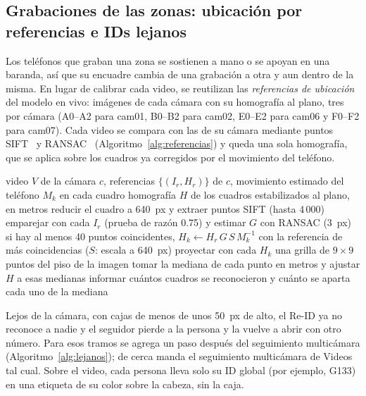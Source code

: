 \documentclass[12pt,a4paper]{article}
\begin{document}
\subsection{Grabaciones de las zonas: ubicación por referencias e IDs lejanos}
\label{sec:grabaciones-zonas}

Los teléfonos que graban una zona se sostienen a mano o se apoyan en una
baranda, así que su encuadre cambia de una grabación a otra y aun dentro de
la misma. En lugar de calibrar cada video, se reutilizan las
\textit{referencias de ubicación} del modelo en vivo: imágenes de cada cámara
con su homografía al plano, tres por cámara (A0--A2 para cam01, B0--B2 para
cam02, E0--E2 para cam06 y F0--F2 para cam07). Cada video se compara con las
de su cámara mediante puntos SIFT~\cite{lowe2004} y RANSAC~\cite{fischler1981}
(Algoritmo~\ref{alg:referencias}) y queda una sola homografía,
que se aplica sobre los cuadros ya corregidos por el movimiento del teléfono.

\begin{algorithm}[H]
\caption{Ubicación de una grabación con las referencias del en vivo}
\label{alg:referencias}
\begin{algorithmic}[1]
\REQUIRE video $V$ de la cámara $c$, referencias $\{(I_r, H_r)\}$ de $c$, movimiento estimado del teléfono $M_k$ en cada cuadro
\ENSURE homografía $H$ de los cuadros estabilizados al plano, en metros
  \STATE reducir el cuadro a 640~px y extraer puntos SIFT (hasta 4\,000)
  \STATE emparejar con cada $I_r$ (prueba de razón 0.75) y estimar $G$ con RANSAC (3~px)
  \STATE si hay al menos 40 puntos coincidentes, $H_k \leftarrow H_r\, G\, S\, M_k^{-1}$ con la referencia de más coincidencias ($S$: escala a 640~px)
\ENDFOR
\STATE proyectar con cada $H_k$ una grilla de $9 \times 9$ puntos del piso de la imagen
\STATE tomar la mediana de cada punto en metros y ajustar $H$ a esas medianas
\STATE informar cuántos cuadros se reconocieron y cuánto se aparta cada uno de la mediana
\end{algorithmic}
\end{algorithm}

Lejos de la cámara, con cajas de menos de unos 50~px de alto, el Re-ID ya no
reconoce a nadie y el seguidor pierde a la persona y la vuelve a abrir con
otro número. Para esos tramos se agrega un paso después del seguimiento
multicámara (Algoritmo~\ref{alg:lejanos}); de cerca manda el seguimiento
multicámara de Videos tal cual. Sobre el video, cada persona lleva solo su ID global (por ejemplo,
G133) en una etiqueta de su color sobre la cabeza, sin la caja.
\end{document}
